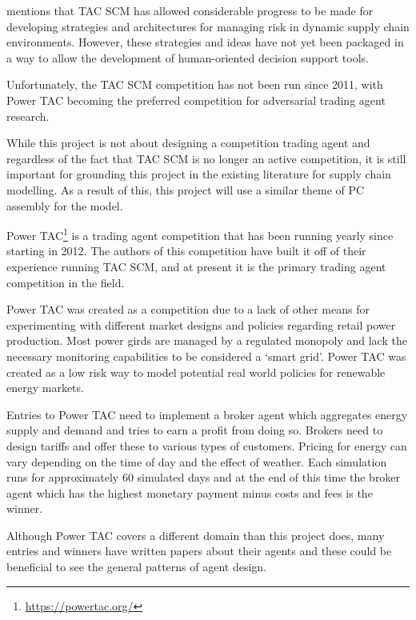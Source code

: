  mentions that TAC SCM has allowed considerable pro\-gress to be made for developing strategies and architectures for managing risk in dynamic supply chain environments.
However, these strategies and ideas have not yet been packaged in a way to allow the development of human-oriented decision support tools.

Unfortunately, the TAC SCM competition has not been run since 2011, with Power TAC becoming the preferred competition for adversarial trading agent research.

While this project is not about designing a competition trading agent and regardless of the fact that TAC SCM is no longer an active competition, it is still important for grounding this project in the existing literature for supply chain modelling.
As a result of this, this project will use a similar theme of PC assembly for the model.

Power TAC\footnote{\url{https://powertac.org/}} is a trading agent competition that has been running yearly since starting in 2012.
The authors of this competition have built it off of their experience running TAC SCM, and at present it is the primary trading agent competition in the field.~\cite{ketter2013power}

Power TAC was created as a competition due to a lack of other means for experimenting with different market designs and policies regarding retail power production.
Most power girds are managed by a regulated monopoly and lack the necessary monitoring capabilities to be considered a `smart grid'.
Power TAC was created as a low risk way to model potential real world policies for renewable energy markets.~\cite{ketter2013power}

Entries to Power TAC need to implement a broker agent which aggregates energy supply and demand and tries to earn a profit from doing so.
Brokers need to design tariffs and offer these to various types of customers.
Pricing for energy can vary depending on the time of day and the effect of weather.
Each simulation runs for approximately 60 simulated days and at the end of this time the broker agent which has the highest monetary payment minus costs and fees is the winner.~\cite{ketter2020power}

Although Power TAC covers a different domain than this project does, many entries and winners have written papers about their agents and these could be beneficial to see the general patterns of agent design.
